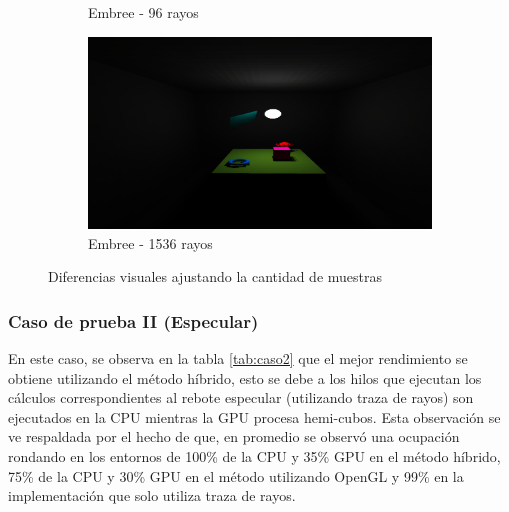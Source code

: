 \begin{figure}[htbp]
\begin{subfigure}{0.45\textwidth}
		\caption{Embree - 96 rayos}
	\end{subfigure}
	\begin{subfigure}{0.45\textwidth}
		\includegraphics[width=1\linewidth]{assets/512srt}
		\caption{Embree - 1536 rayos}
	\end{subfigure}
	\caption{Diferencias visuales ajustando la cantidad de muestras}
	\label{img:difres}
\end{figure}

\subsubsection{Caso de prueba II (Especular)}

En este caso, se observa en la tabla \ref{tab:caso2} que el mejor rendimiento se obtiene utilizando el método híbrido, esto se debe a los hilos que ejecutan los cálculos correspondientes al rebote especular (utilizando traza de rayos) son ejecutados en la CPU mientras la GPU procesa hemi-cubos. Esta observación se ve respaldada por el hecho de que, en promedio se observó una ocupación rondando en los entornos de 100\% de la CPU y 35\% GPU en el método híbrido, 75\% de la CPU y 30\% GPU en el método utilizando OpenGL y 99\% en la implementación que solo utiliza traza de rayos. 


